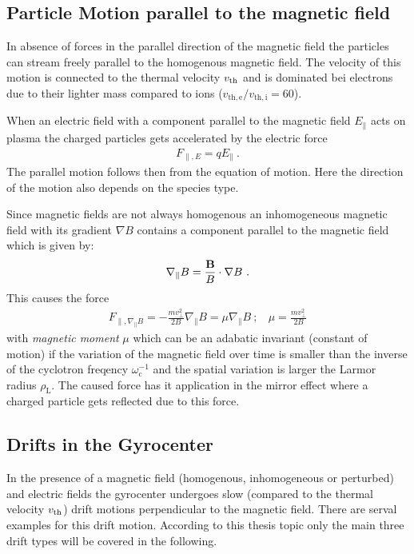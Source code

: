 \newpage

\subsection{Particle Motion parallel to the magnetic field}
\label{sub:parallelmotion}

In absence of forces in the parallel direction of the magnetic field the particles can stream freely parallel to the homogenous magnetic field. The velocity of this motion is connected to the thermal velocity $v_{\mathrm{th}}$ and is dominated bei electrons due to their lighter mass compared to ions ($v_\mathrm{th,e}/v_\mathrm{th,i} = 60$). 

When an electric field with a component parallel to the magnetic field $E_\parallel$ acts on plasma the charged particles gets accelerated by the electric force
\begin{gather}
    F_{\parallel,E} = qE_\parallel~.
\end{gather}
The parallel motion follows then from the equation of motion. Here the direction of the motion also depends on the species type.

Since magnetic fields are not always homogenous an inhomogeneous magnetic field with its gradient $\nabla B$ contains a component parallel to the magnetic field which is given by:
\begin{gather}
    \nabla_\parallel B = \frac{\boldsymbol{\mathbf{B}}}{B} \cdot \nabla B~.
\end{gather}
This causes the force
\begin{gather}
    F_{\parallel,\nabla_\parallel B} = - \frac{mv^2_{\perp}}{2B} \nabla_\parallel B = \mu \nabla_\parallel B~;~~~~\mu = \frac{mv^2_{\perp}}{2B}
\end{gather}
with \textit{magnetic moment} $\mu$ which can be an adabatic invariant (constant of motion) if the variation of the magnetic field over time is smaller than the inverse of the cyclotron freqency $\omega^{-1}_\mathrm{c}$ and the spatial variation is larger the Larmor radius $\rho_\mathrm{L}$. The caused force has it application in the mirror effect where a charged particle gets reflected due to this force. \cite{Wesson2011}

\newpage

\subsection{Drifts in the Gyrocenter}
\label{sub:drift}

In the presence of a magnetic field (homogenous, inhomogeneous or perturbed) and electric fields the gyrocenter undergoes slow (compared to the thermal velocity $v_{\mathrm{th}}$) drift motions perpendicular to the magnetic field. There are serval examples for this drift motion. According to this thesis topic only the main three drift types will be covered in the following.

